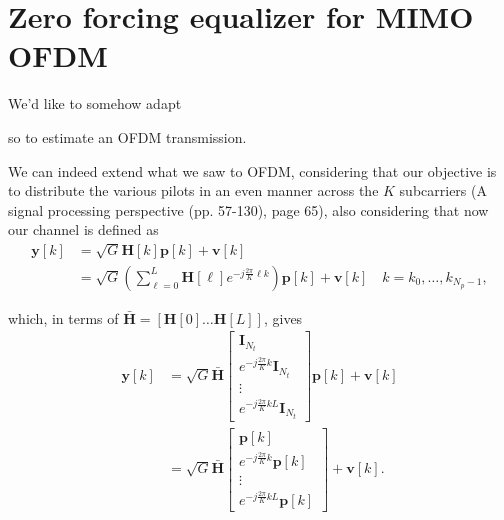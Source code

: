 \documentclass[a4paper, 12pt]{book}
\begin{document}
\noindent\color{teal}\color{black}

\section{Zero forcing equalizer for MIMO OFDM}

We'd like to somehow adapt \\

so to estimate an OFDM transmission.

We can indeed extend what we saw to OFDM, considering that our objective is to distribute the various pilots in an even manner across the $K$ subcarriers (A signal processing perspective (pp. 57-130), page 65), also considering that now our channel is defined as
\begin{align}
\mathbf{y}[k] &= \sqrt{G}\mathbf{H}[k]\mathbf{p}[k] + \mathbf{v}[k] \tag{2.288} \\
&= \sqrt{G}\left( \sum_{\ell=0}^{L} \boldsymbol{H}[\ell]e^{-j\frac{2\pi}{K}\ell k} \right) \mathbf{p}[k] + \mathbf{v}[k] \quad k=k_0, \dots, k_{N_p-1}, \tag{2.289}
\end{align}

which, in terms of $\bar{\boldsymbol{H}} = [\boldsymbol{H}[0] \dots \boldsymbol{H}[L]]$, gives
\begin{align}
\mathbf{y}[k] &= \sqrt{G}\bar{\boldsymbol{H}}
\begin{bmatrix}
\boldsymbol{I}_{N_t} \\
e^{-j\frac{2\pi}{K}k}\boldsymbol{I}_{N_t} \\
\vdots \\
e^{-j\frac{2\pi}{K}kL}\boldsymbol{I}_{N_t}
\end{bmatrix} \mathbf{p}[k] + \mathbf{v}[k] \tag{2.290} \\
&= \sqrt{G}\bar{\boldsymbol{H}}
\begin{bmatrix}
\mathbf{p}[k] \\
e^{-j\frac{2\pi}{K}k}\mathbf{p}[k] \\
\vdots \\
e^{-j\frac{2\pi}{K}kL}\mathbf{p}[k]
\end{bmatrix} + \mathbf{v}[k]. \tag{2.291}
\end{align}
\end{document}
